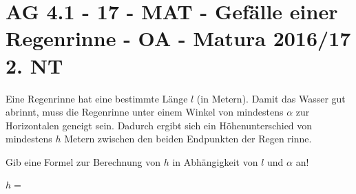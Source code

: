 \section{AG 4.1 - 17 - MAT - Gefälle einer Regenrinne - OA - Matura 2016/17 2. NT}

\begin{beispiel}[AG 4.1]{1} %
Eine Regenrinne hat eine bestimmte Länge $l$ (in Metern). Damit das Wasser gut abrinnt, muss die Regenrinne unter einem Winkel von mindestens $\alpha$ zur Horizontalen geneigt sein. Dadurch ergibt sich ein Höhenunterschied von mindestens $h$ Metern zwischen den beiden Endpunkten der Regen rinne.

Gib eine Formel zur Berechnung von $h$ in Abhängigkeit von $l$ und $\alpha$ an!\leer

$h=$\,
\end{beispiel}